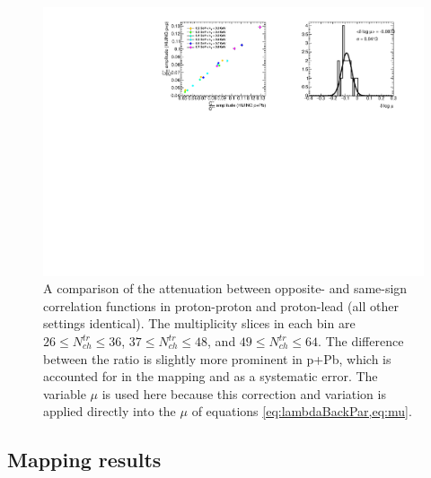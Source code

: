 \begin{figure}[t]
\begin{minipage}[t]{1.0\textwidth}
\centering
\includegraphics{mu_hijing_pp_pPb.pdf}
\end{minipage}
\caption{A comparison of the attenuation between opposite- and same-sign correlation functions in \Hijing proton-proton and \Hijing proton-lead (all other settings identical). The multiplicity slices in each \kt bin are $26 \leq N_{ch}^{tr} \leq 36$, $37 \leq N_{ch}^{tr} \leq 48$, and $49 \leq N_{ch}^{tr} \leq 64$. The difference between the ratio is slightly more prominent in p+Pb, which is accounted for in the mapping and as a systematic error. The variable $\mu$ is used here because this correction and variation is applied directly into the $\mu$ of equations \cref{eq:lambdaBackPar,eq:mu}.}
\label{fig:mu_hijing_pp_pPb}
\end{figure}

\FloatBarrier

\subsection{Mapping results}

